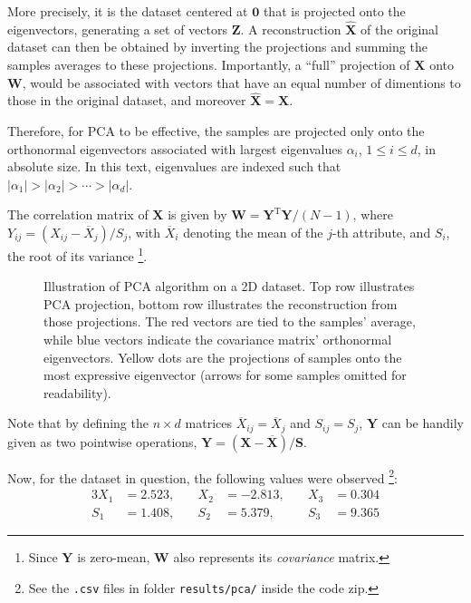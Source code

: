 More precisely, it is the dataset centered at $\mathbf{0}$ that is projected onto the eigenvectors, 
generating a set of vectors $\mathbf{Z}$.
A reconstruction $\widehat{\mathbf{X}}$ of the original dataset can then be obtained by 
inverting the projections and summing the samples averages to these projections.
%
Importantly, a ``full'' projection of $\mathbf{X}$ onto $\mathbf{W}$,
would be associated with vectors that have an equal number of dimentions to those in the original dataset,
and moreover $\widehat{\mathbf{X}} = \mathbf{X}$.

Therefore, for PCA to be effective, the samples are projected only onto 
the orthonormal eigenvectors associated with largest eigenvalues $\alpha_i$, $1\leq i\leq d$, in absolute size.
In this text, eigenvalues are indexed such that $|\alpha_1| > |\alpha_2| > \cdots > |\alpha_d|$.

The correlation matrix of $\mathbf{X}$ is given by $\mathbf{W} = \mathbf{Y}^\mathrm{T}\mathbf{Y} / (N-1)$,
where $Y_{ij} = (X_{ij}-\overline{X}_j) / S_j$,
with $\overline{X}_i$ denoting the mean of the $j$-th attribute,
and $S_i$, the root of its variance%
\footnote{
    Since $\mathbf{Y}$ is zero-mean, $\mathbf{W}$ also represents its \textit{covariance} matrix.
}.

\begin{figure}[htb]
    \centering
    \caption{
        Illustration of PCA algorithm on a 2D dataset.
        Top row illustrates PCA projection, 
        bottom row illustrates the reconstruction from those projections.
        The red vectors are tied to the samples' average,
        while blue vectors indicate the covariance matrix' orthonormal eigenvectors.
        Yellow dots are the projections of samples onto the most expressive eigenvector
        (arrows for some samples omitted for readability).
    }
    \label{fig:pca-illustration}
    
\end{figure}

Note that by defining the $n \times d$ matrices 
$\overline{X}_{ij} = \overline{X}_j$ and
$S_{ij} = S_j$,
$\mathbf{Y}$ can be handily given as two pointwise operations,
$\mathbf{Y} = (\mathbf{X}-\overline{\mathbf{X}}) / \mathbf{S}$.

Now, for the dataset in question, the following values were observed%
\footnote{%
    See the \texttt{.csv} files in folder \texttt{results/pca/} inside the code zip.
}:
%
\begin{alignat}{3}
    X_1 &= 2.523,\quad& X_2 &= -2.813,\quad& X_3 &= 0.304 \\
    S_1 &= 1.408,\quad& S_2 &=  5.379,\quad& S_3 &= 9.365
\end{alignat}

